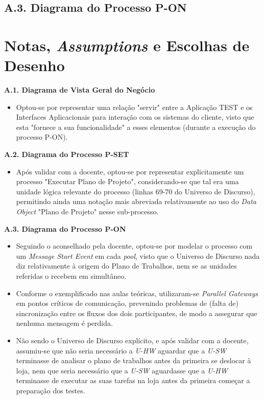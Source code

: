 \documentclass[12pt,a4paper]{article}
\begin{document}
\begin{landscape}
	\section*{A.3. Diagrama do Processo P-ON}
	
\end{landscape}

\section*{Notas, \emph{Assumptions} e Escolhas de Desenho} \label{notes}
\normalsize
\textbf{A.1. Diagrama de Vista Geral do Negócio}
\begin{itemize}
	\item Optou-se por representar uma relação "servir" entre a Aplicação TEST e os Interfaces Aplicacionais para interação com os sistemas do cliente, visto que esta "fornece a sua funcionalidade" a esses elementos (durante a execução do processo P-ON).
\end{itemize}
\textbf{A.2. Diagrama do Processo P-SET}
\begin{itemize}
	\item Após validar com a docente, optou-se por representar explicitamente um processo "Executar Plano de Projeto", considerando-se que tal era uma unidade lógica relevante do processo (linhas 69-70 do Universo de Discurso), permitindo ainda uma notação mais abreviada relativamente ao uso do \emph{Data Object} "Plano de Projeto" nesse sub-processo.
\end{itemize}
\textbf{A.3. Diagrama do Processo P-ON}
\begin{itemize}
	\item Seguindo o aconselhado pela docente, optou-se por modelar o processo com um \emph{Message Start Event} em cada \emph{pool}, visto que o Universo de Discurso nada diz relativamente à origem do Plano de Trabalhos, nem se as unidades referidas o recebem em simultâneo.
	\item Conforme o exemplificado nas aulas teóricas, utilizaram-se \emph{Parallel Gateways} em pontos críticos de comunicação, prevenindo problemas de (falta de) sincronização entre os fluxos dos dois participantes, de modo a assegurar que nenhuma mensagem é perdida.
	\item Não sendo o Universo de Discurso explícito, e após validar com a docente, assumiu-se que não seria necessário a \emph{U-HW} aguardar que a \emph{U-SW} terminasse de analisar o plano de trabalhos antes da primeira se deslocar à loja, nem que seria necessário que a \emph{U-SW} aguardasse que a \emph{U-HW} terminasse de executar as suas tarefas na loja antes da primeira começar a preparação dos testes.
\end{itemize}
\end{document}
